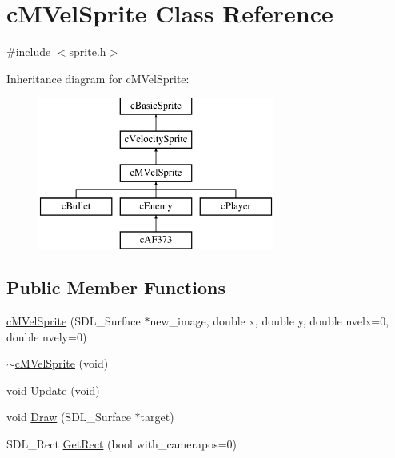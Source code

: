 \hypertarget{classc_m_vel_sprite}{\section{c\-M\-Vel\-Sprite Class Reference}
\label{classc_m_vel_sprite}
}


{\ttfamily \#include $<$sprite.\-h$>$}

Inheritance diagram for c\-M\-Vel\-Sprite\-:\begin{figure}[H]
\begin{center}
\leavevmode
\includegraphics[height=5.000000cm]{classc_m_vel_sprite}
\end{center}
\end{figure}
\subsection*{Public Member Functions}
\begin{DoxyCompactItemize}
\item 
\hyperlink{classc_m_vel_sprite_a133741fdaeec59700dbc0e094d1e3ad6}{c\-M\-Vel\-Sprite} (S\-D\-L\-\_\-\-Surface $\ast$new\-\_\-image, double x, double y, double nvelx=0, double nvely=0)
\item 
\hyperlink{classc_m_vel_sprite_ac7493a3ea06d6a7d3aa99488a135b2e1}{$\sim$c\-M\-Vel\-Sprite} (void)
\item 
void \hyperlink{classc_m_vel_sprite_a0472c4eecda7bba06bef8bb5a8a2312f}{Update} (void)
\item 
void \hyperlink{classc_m_vel_sprite_a4ab825cec1e8d50a9c5a7afa5cd8ec93}{Draw} (S\-D\-L\-\_\-\-Surface $\ast$target)
\item 
S\-D\-L\-\_\-\-Rect \hyperlink{classc_m_vel_sprite_ad500f3c6a50c0d289f9c662f68170970}{Get\-Rect} (bool with\-\_\-camerapos=0)
\end{DoxyCompactItemize}
